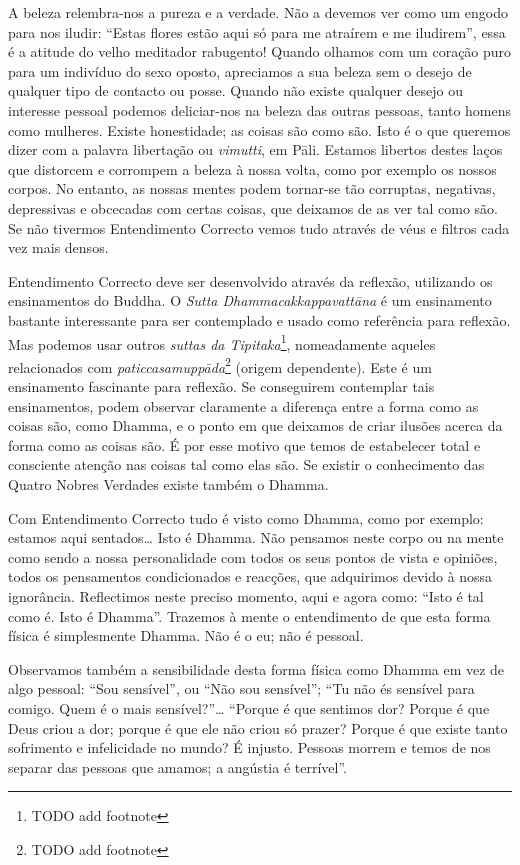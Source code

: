 A beleza relembra-nos a pureza e a verdade. Não a devemos ver como um engodo
para nos iludir: “Estas flores estão aqui só para me atraírem e me iludirem”,
essa é a atitude do velho meditador rabugento! Quando olhamos com um coração
puro para um indivíduo do sexo oposto, apreciamos a sua beleza sem o desejo de
qualquer tipo de contacto ou posse. Quando não existe qualquer desejo ou
interesse pessoal podemos deliciar-nos na beleza das outras pessoas, tanto
homens como mulheres. Existe honestidade; as coisas são como são. Isto é o que
queremos dizer com a palavra libertação ou \emph{vimutti}, em Pāli. Estamos
libertos destes laços que distorcem e corrompem a beleza à nossa volta, como por
exemplo os nossos corpos. No entanto, as nossas mentes podem tornar-se tão
corruptas, negativas, depressivas e obcecadas com certas coisas, que deixamos de
as ver tal como são. Se não tivermos Entendimento Correcto vemos tudo através de
véus e filtros cada vez mais densos.

Entendimento Correcto deve ser desenvolvido através da reflexão, utilizando os
ensinamentos do Buddha. O \emph{Sutta Dhammacakkappavattāna} é um ensinamento
bastante interessante para ser contemplado e usado como referência para
reflexão. Mas podemos usar outros \emph{suttas da Tipitaka}\footnote{TODO add
  footnote}, nomeadamente aqueles relacionados com
\emph{paticcasamuppāda}\footnote{TODO add footnote} (origem dependente). Este é
um ensinamento fascinante para reflexão. Se conseguirem contemplar tais
ensinamentos, podem observar claramente a diferença entre a forma como as coisas
são, como Dhamma, e o ponto em que deixamos de criar ilusões acerca da forma
como as coisas são. É por esse motivo que temos de estabelecer total e
consciente atenção nas coisas tal como elas são. Se existir o conhecimento das
Quatro Nobres Verdades existe também o Dhamma.

Com Entendimento Correcto tudo é visto como Dhamma, como por exemplo: estamos
aqui sentados\ldots{} Isto é Dhamma. Não pensamos neste corpo ou na mente como
sendo a nossa personalidade com todos os seus pontos de vista e opiniões, todos
os pensamentos condicionados e reacções, que adquirimos devido à nossa
ignorância. Reflectimos neste preciso momento, aqui e agora como: “Isto é tal
como é. Isto é Dhamma”. Trazemos à mente o entendimento de que esta forma física
é simplesmente Dhamma. Não é o eu; não é pessoal.

Observamos também a sensibilidade desta forma física como Dhamma em vez de algo
pessoal: “Sou sensível”, ou “Não sou sensível”; “Tu não és sensível para comigo.
Quem é o mais sensível?”\ldots{} “Porque é que sentimos dor? Porque é que Deus
criou a dor; porque é que ele não criou só prazer? Porque é que existe tanto
sofrimento e infelicidade no mundo? É injusto. Pessoas morrem e temos de nos
separar das pessoas que amamos; a angústia é terrível”.

